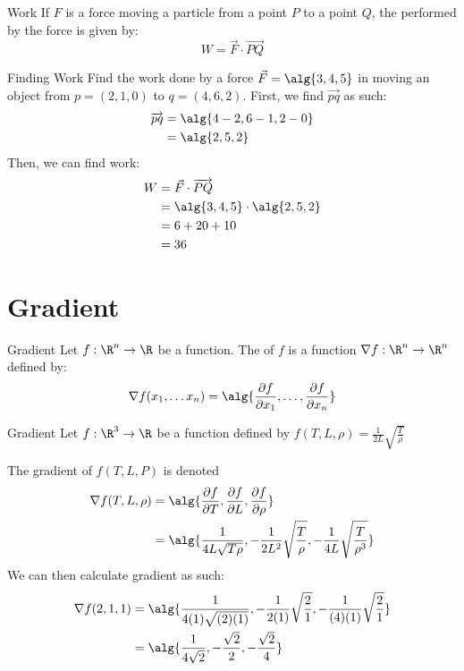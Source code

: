 \begin{dfnbox}{Work}{}
    If $F$ is a force moving a particle from a point $P$ to a point $Q$, the  performed by the force is given by:
    \[ W = \vec{F} \cdot \overrightarrow{PQ} \]
\end{dfnbox}

\begin{exbox}{Finding Work}{}
    Find the work done by a force $\vec{F} = \alg{3,4,5}$ in moving an object from $p = (2,1,0)$ to $q = (4,6,2)$.
    \tcblower
    First, we find $\overrightarrow{pq}$ as such:
    \begin{align*}
        \overrightarrow{pq}
        &= \alg{4-2, 6-1, 2-0} \\
        &= \alg{2,5,2}
    \end{align*}
    Then, we can find work:
    \begin{align*}
        W
        &= \vec{F} \cdot \overrightarrow{PQ} \\
        &= \alg{3,4,5} \cdot \alg{2,5,2} \\
        &= 6 + 20 + 10 \\
        &= 36
    \end{align*}
\end{exbox}

\section{Gradient}

\begin{dfnbox}{Gradient}{}
    Let $f : \R^n \to \R$ be a function. The  of $f$ is a function $\nabla f : \R^n \to \R^n$ defined by:
    \[ \nabla f(x_1, \ldots x_n) = \alg{ \frac{\partial f}{\partial x_1} , \ldots , \frac{\partial f}{\partial x_n} } \]
\end{dfnbox}

\begin{exbox}{Gradient}{}
    Let $f : \R^3 \to \R$ be a function defined by $f(T,L,\rho) = \frac{1}{2L} \sqrt{\frac{T}{\rho}}$

    The gradient of $f(T,L,P)$ is denoted
    \begin{align*}
        \nabla f(T,L,\rho)
        &= \alg{\frac{\partial f}{\partial T}, \frac{\partial f}{\partial L}, \frac{\partial f}{\partial \rho}} \\
        &= \alg{\frac{1}{4L\sqrt{T \rho}}, -\frac{1}{2L^2} \sqrt{\frac{T}{\rho}}, -\frac{1}{4L} \sqrt{\frac{T}{\rho^3}}}
    \end{align*}
    We can then calculate gradient as such:
    \begin{align*}
        \nabla f(2,1,1)
        &= \alg{ \frac{1}{4(1)\sqrt{(2)(1)}} , -\frac{1}{2(1)}\sqrt{\frac{2}{1}} , -\frac{1}{(4)(1)} \sqrt{\frac{2}{1}} } \\
        &= \alg{ \frac{1}{4\sqrt{2}} , -\frac{\sqrt{2}}{2} , - \frac{\sqrt{2}}{4} }
    \end{align*}
\end{exbox}

